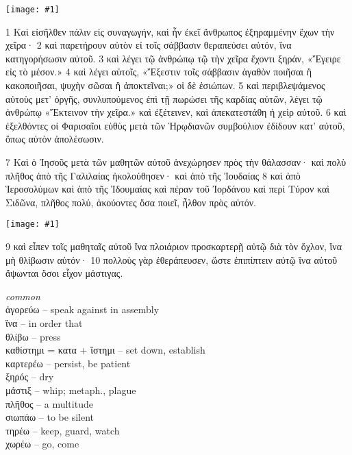 \documentclass[10pt,a5paper,twoside,twocolumn]{book}
\newcommand{\newchapter}{\stepcounter{chapter}}
\newcommand{\fig}[1]{\texttt{[image: \#1]}\label{fig:#1}}
\newcommand*\cleartoleftpage{%
  \ifodd\value{page}\hbox{}\clearpage\fi
}
\newcommand{\sceneseparator}{%
  \vspace{-0.7\baselineskip}%
  \hspace{-0.01\textwidth}\noindent\makebox[\linewidth]{\resizebox{0.15\linewidth}{1pt}{$\bullet$}}%
  \vspace{-0.2\baselineskip}
}
\newenvironment{facing}{\cleartoleftpage}{\clearpage\pagebreak}
\newenvironment{help}{\clearpage}{}
\newenvironment{helpsec}{\begin{minipage}[t]{\textwidth}\begin{multicols}{2}}{\end{multicols}\end{minipage}}
\newenvironment{vocab}{\begin{helpsec}}{\end{helpsec}}
\begin{document}
\newchapter

\begin{facing}

\fig{03-01} %

1 Καὶ εἰσῆλθεν πάλιν εἰς συναγωγήν, καὶ ἦν ἐκεῖ ἄνθρωπος ἐξηραμμένην ἔχων τὴν χεῖρα· 2 καὶ παρετήρουν αὐτὸν εἰ τοῖς σάββασιν θεραπεύσει αὐτόν, ἵνα κατηγορήσωσιν αὐτοῦ. 
3 καὶ λέγει τῷ ἀνθρώπῳ τῷ τὴν χεῖρα ἔχοντι ξηράν, «Ἔγειρε εἰς τὸ μέσον.»
4 καὶ λέγει αὐτοῖς, «Ἔξεστιν τοῖς σάββασιν ἀγαθὸν ποιῆσαι ἢ κακοποιῆσαι, ψυχὴν σῶσαι ἢ ἀποκτεῖναι;» οἱ δὲ ἐσιώπων.
5 καὶ περιβλεψάμενος αὐτοὺς μετ’ ὀργῆς, συνλυπούμενος ἐπὶ τῇ πωρώσει τῆς καρδίας αὐτῶν, λέγει τῷ ἀνθρώπῳ «Ἔκτεινον τὴν χεῖρα.»
 καὶ ἐξέτεινεν, καὶ ἀπεκατεστάθη ἡ χεὶρ αὐτοῦ. 
6 καὶ ἐξελθόντες οἱ Φαρισαῖοι εὐθὺς μετὰ τῶν Ἡρῳδιανῶν συμβούλιον ἐδίδουν κατ’ αὐτοῦ, ὅπως αὐτὸν ἀπολέσωσιν. 	

\sceneseparator

7 Καὶ ὁ Ἰησοῦς μετὰ τῶν μαθητῶν αὐτοῦ ἀνεχώρησεν πρὸς τὴν θάλασσαν· καὶ πολὺ πλῆθος ἀπὸ τῆς Γαλιλαίας ἠκολούθησεν· καὶ ἀπὸ τῆς Ἰουδαίας 8 καὶ ἀπὸ Ἱεροσολύμων καὶ ἀπὸ τῆς Ἰδουμαίας καὶ πέραν τοῦ Ἰορδάνου καὶ περὶ Τύρον καὶ Σιδῶνα, πλῆθος πολύ, ἀκούοντες ὅσα ποιεῖ, ἦλθον πρὸς αὐτόν. 

\fig{03-09} %

9 καὶ εἶπεν τοῖς μαθηταῖς αὐτοῦ ἵνα πλοιάριον προσκαρτερῇ αὐτῷ διὰ τὸν ὄχλον, ἵνα μὴ θλίβωσιν αὐτόν· 10 πολλοὺς γὰρ ἐθεράπευσεν, ὥστε ἐπιπίπτειν αὐτῷ ἵνα αὐτοῦ ἅψωνται ὅσοι εἶχον μάστιγας. 

\begin{help}
\begin{vocab}
\emph{common}\\
ἀγορεύω -- speak against in assembly\\
ἵνα -- in order that\\
θλίβω -- press\\
καθίστημι = κατα + ἵστημι -- set down, establish\\
καρτερέω -- persist, be patient\\
ξηρός -- dry\\
μάστιξ -- whip; metaph., plague\\
πλῆθος -- a multitude\\
σιωπάω -- to be silent\\
τηρέω -- keep, guard, watch\\
χωρέω -- go, come\\


\end{vocab}
\end{help}
\end{facing}
\end{document}
